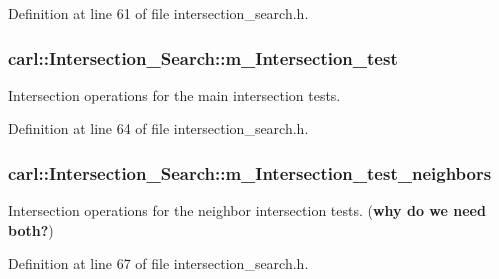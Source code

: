 Definition at line 61 of file intersection\+\_\+search.\+h.

\hypertarget{classcarl_1_1_intersection___search_afeedb5ff9144638151b7f956cf113fc4}{}
\subsubsection[{m\+\_\+\+Intersection\+\_\+test}]{ carl\+::\+Intersection\+\_\+\+Search\+::m\+\_\+\+Intersection\+\_\+test\hspace{0.3cm}{\ttfamily [protected]}}\label{classcarl_1_1_intersection___search_afeedb5ff9144638151b7f956cf113fc4}


Intersection operations for the main intersection tests. 



Definition at line 64 of file intersection\+\_\+search.\+h.

\hypertarget{classcarl_1_1_intersection___search_a7abbfa5dc5892d9179b93563320d533b}{}
\subsubsection[{m\+\_\+\+Intersection\+\_\+test\+\_\+neighbors}]{ carl\+::\+Intersection\+\_\+\+Search\+::m\+\_\+\+Intersection\+\_\+test\+\_\+neighbors\hspace{0.3cm}{\ttfamily [protected]}}\label{classcarl_1_1_intersection___search_a7abbfa5dc5892d9179b93563320d533b}


Intersection operations for the neighbor intersection tests. ({\bfseries why do we need both?}) 



Definition at line 67 of file intersection\+\_\+search.\+h.

\hypertarget{classcarl_1_1_intersection___search_a15b8deaf751e8d0fb91d8e7eed9aefb6}{}
